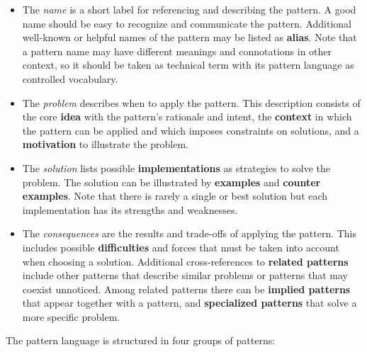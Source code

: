 \begin{itemize}

  \item The \emph{name} is a short label for referencing and describing
    the pattern. A good name should be easy to recognize and communicate
    the pattern. Additional well-known or helpful names of the pattern may
    be listed as \textbf{alias}. Note that a pattern name may have different 
    meanings and connotations in other context, so it should be taken as 
    technical term with its pattern language as controlled vocabulary. 

  \item The \emph{problem} describes when to apply the pattern. This
    description consists of the core \textbf{idea} with the 
    pattern's rationale and intent, the    \textbf{context} in which the 
    pattern can be applied and which imposes constraints on solutions,
    and a \textbf{motivation} to illustrate the problem.

  \item The \emph{solution} lists possible \textbf{implementations}
    as strategies to solve the problem. The solution can be illustrated
    by \textbf{examples} and \textbf{counter examples}. Note that there
    is rarely a single or best solution but each implementation has 
    its strengths and weaknesses.

 \item The \emph{consequences} are the results and trade-offs of
   applying the pattern. This includes possible \textbf{difficulties}
   and forces that must be taken into account when choosing a solution.
   Additional cross-references to \textbf{related patterns} include other 
   patterns that describe similar problems or patterns that may coexist
   unnoticed. Among related patterns there can be \textbf{implied patterns} 
   that appear together with a pattern, and 
   \textbf{specialized patterns} that solve a more specific problem.
\end{itemize}

\noindent
The pattern language is structured in four groups of patterns:

